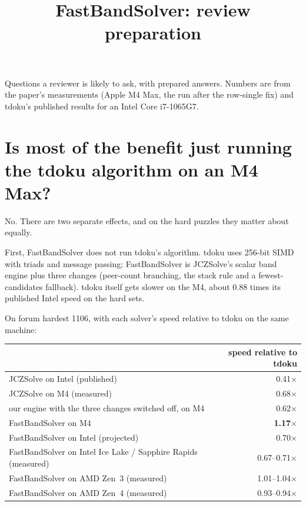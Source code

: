 \documentclass[11pt]{article}
\title{FastBandSolver: review preparation}
\date{}
\begin{document}
\maketitle

Questions a reviewer is likely to ask, with prepared answers. Numbers are from the paper's measurements (Apple M4
Max, the run after the row-single fix) and tdoku's published results for an Intel Core i7-1065G7.

\section*{Is most of the benefit just running the tdoku algorithm on an M4 Max?}

No. There are two separate effects, and on the hard puzzles they matter about equally.

First, FastBandSolver does not run tdoku's algorithm. tdoku uses 256-bit SIMD with triads and message passing;
FastBandSolver is JCZSolve's scalar band engine plus three changes (peer-count branching, the stack rule and a
fewest-candidates fallback). tdoku itself gets slower on the M4, about 0.88 times its published Intel speed on the hard
sets.

On forum hardest 1106, with each solver's speed relative to tdoku on the same machine:

\begin{center}
\begin{tabular}{lr}
\toprule
 & speed relative to tdoku \\
\midrule
JCZSolve on Intel (published) & 0.41$\times$ \\
JCZSolve on M4 (measured) & 0.68$\times$ \\
our engine with the three changes switched off, on M4 & 0.62$\times$ \\
FastBandSolver on M4 & \textbf{1.17$\times$} \\
FastBandSolver on Intel (projected) & 0.70$\times$ \\
FastBandSolver on Intel Ice Lake / Sapphire Rapids (measured) & 0.67--0.71$\times$ \\
FastBandSolver on AMD Zen~3 (measured) & 1.01--1.04$\times$ \\
FastBandSolver on AMD Zen~4 (measured) & 0.93--0.94$\times$ \\
\bottomrule
\end{tabular}
\end{center}
\end{document}

